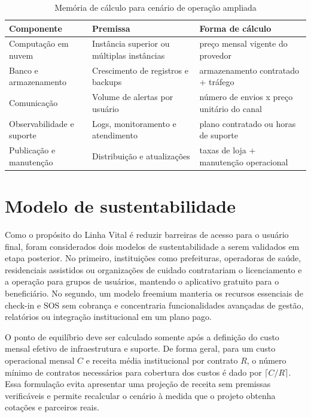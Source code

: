 \begin{table}[H]
\caption{Memória de cálculo para cenário de operação ampliada}
\label{tab_cenario_escalado}
\centering
\footnotesize
\begin{tabular}{p{4cm}p{4cm}p{5cm}}
\hline
\textbf{Componente} & \textbf{Premissa} & \textbf{Forma de cálculo} \\
\hline
Computação em nuvem & Instância superior ou múltiplas instâncias & preço mensal vigente do provedor \\
Banco e armazenamento & Crescimento de registros e backups & armazenamento contratado + tráfego \\
Comunicação & Volume de alertas por usuário & número de envios x preço unitário do canal \\
Observabilidade e suporte & Logs, monitoramento e atendimento & plano contratado ou horas de suporte \\
Publicação e manutenção & Distribuição e atualizações & taxas de loja + manutenção operacional \\
\hline
\end{tabular}
\end{table}

\section{Modelo de sustentabilidade}

Como o propósito do Linha Vital é reduzir barreiras de acesso para o usuário final, foram considerados dois modelos de sustentabilidade a serem validados em etapa posterior. No primeiro, instituições como prefeituras, operadoras de saúde, residenciais assistidos ou organizações de cuidado contratariam o licenciamento e a operação para grupos de usuários, mantendo o aplicativo gratuito para o beneficiário. No segundo, um modelo freemium manteria os recursos essenciais de check-in e SOS sem cobrança e concentraria funcionalidades avançadas de gestão, relatórios ou integração institucional em um plano pago.

O ponto de equilíbrio deve ser calculado somente após a definição do custo mensal efetivo de infraestrutura e suporte. De forma geral, para um custo operacional mensal $C$ e receita média institucional por contrato $R$, o número mínimo de contratos necessários para cobertura dos custos é dado por $\lceil C/R \rceil$. Essa formulação evita apresentar uma projeção de receita sem premissas verificáveis e permite recalcular o cenário à medida que o projeto obtenha cotações e parceiros reais.

